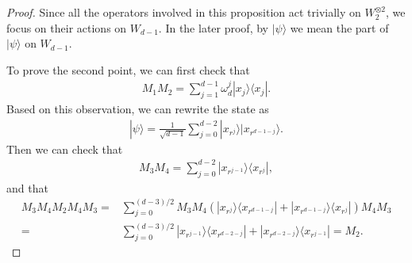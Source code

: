 \documentclass[11pt,letterpaper]{article}
\newcommand{\ket}[1]{|#1\rangle}
\newcommand{\ketbra}[2]{|#1\rangle\langle#2|}
\newcommand{\x}{\otimes}
\newcommand{\1}{\mathbb{1}}
\theoremstyle{definition}
\begin{document}
\begin{proof}
	Since all the operators involved in this proposition act trivially on $W_2^{\x 2}$, we focus on
	their actions on $W_{d-1}$. In the later proof, by $\ket{\psi}$ we mean the part of $\ket{\psi}$ on $W_{d-1}$.
	
	To prove the second point, we can first check that
	\begin{align}
		M_1M_2= \sum_{j=1}^{d-1} \omega_d^j \ketbra{x_j}{x_j}.
	\end{align}
	Based on this observation, we can rewrite the state as
	\begin{align}
		\ket{\psi} = \frac{1}{\sqrt{d-1}} \sum_{j=0}^{d-2} \ket{x_{r^j}}\ket{x_{r^{d-1-j}}}.
	\end{align}
	Then we can check that 
	\begin{align}
		M_3M_4= \sum_{j=0}^{d-2} \ketbra{x_{r^{j-1}}}{x_{r^j}},
	\end{align}
	and that 
	\begin{align}
		M_3M_4 M_2 M_4 M_3 = &\sum_{j=0}^{(d-3)/2} M_3M_4 (\ketbra{x_{r^j}}{x_{r^{d-1-j}}}+\ketbra{x_{r^{d-1-j}}}{x_{r^j}}) M_4M_3\\
		=& \sum_{j=0}^{(d-3)/2} \ketbra{x_{r^{j-1}}}{x_{r^{d-2-j}}}+\ketbra{x_{r^{d-2-j}}}{x_{r^{j-1}}} = M_2.
	\end{align}
	

\end{proof}
\end{document}

